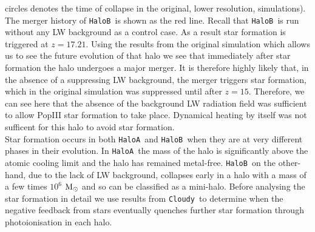 \documentclass[graphics, twocolumn, usenatbib]{mn2e}
\newcommand{\cloudy}{\texttt{Cloudy~}}
\newcommand{\msolar} {$\rm{M_{\odot}}~$}
\newcommand{\ha} {\texttt{HaloA~}}
\newcommand{\hb} {\texttt{HaloB~}}
\begin{document}
circles denotes the time of collapse in the original, lower resolution, simulations). The merger
history of \hb is shown as the red line. Recall that \hb is run without any LW background as a control case. As a
result star formation is triggered at $z = 17.21$. Using the results from the original simulation
which allows us to see the future evolution of that halo we see that immediately after star formation
the halo undergoes a major merger. It is therefore highly likely that, in the absence of a suppressing
LW background, the merger triggers star formation, which in the original simulation was
suppressed until after $z = 15$. Therefore, we can see here that the absence of the background LW radiation field was sufficient to allow PopIII star formation to take place. Dynamical heating by itself was not sufficent for this halo to 
avoid star formation. \\
\indent Star formation occurs in both \ha and \hb when they are at very different phases in their evolution. In \ha the mass of the halo is significantly above the atomic cooling limit and the halo has
remained metal-free. \hb on the other-hand, due to the lack of LW background, collapses early in a
halo with a mass of a few times $10^6$ \msolar and so can be classified as a mini-halo. Before analysing the star formation in detail we use results from \cloudy to determine when the negative feedback from stars eventually
quenches further star formation through photoionisation in each halo. 
\end{document}
